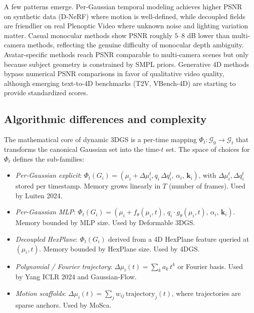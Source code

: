\documentclass{article}
\begin{document}
A few patterns emerge. Per-Gaussian temporal modeling achieves higher PSNR on synthetic data (D-NeRF) where motion is well-defined, while decoupled fields are friendlier on real Plenoptic Video where unknown noise and lighting variation matter. Casual monocular methods show PSNR roughly \(5\)--\(8\) dB lower than multi-camera methods, reflecting the genuine difficulty of monocular depth ambiguity. Avatar-specific methods reach PSNR comparable to multi-camera scenes but only because subject geometry is constrained by SMPL priors. Generative 4D methods bypass numerical PSNR comparisons in favor of qualitative video quality, although emerging text-to-4D benchmarks (T2V, VBench-4D) are starting to provide standardized scores.

\subsection{Algorithmic differences and complexity}\label{algorithmic-differences-and-complexity}

The mathematical core of dynamic 3DGS is a per-time mapping \(\Phi_t: \mathcal{G}_0 \to \mathcal{G}_t\) that transforms the canonical Gaussian set into the time-\(t\) set. The space of choices for \(\Phi_t\) defines the sub-families:

\begin{itemize}

\item
  \emph{Per-Gaussian explicit}: \(\Phi_t(G_i) = (\mu_i + \Delta\mu_i^t, q_i\,\Delta q_i^t,\,\alpha_i,\,\mathbf{k}_i)\), with \(\Delta\mu_i^t,\Delta q_i^t\) stored per timestamp. Memory grows linearly in \(T\) (number of frames). Used by Luiten 2024.
\item
  \emph{Per-Gaussian MLP}: \(\Phi_t(G_i) = (\mu_i + f_\theta(\mu_i,t),\, q_i\cdot g_\theta(\mu_i,t),\,\alpha_i,\,\mathbf{k}_i)\). Memory bounded by MLP size. Used by Deformable 3DGS.
\item
  \emph{Decoupled HexPlane}: \(\Phi_t(G_i)\) derived from a 4D HexPlane feature queried at \((\mu_i,t)\). Memory bounded by HexPlane size. Used by 4DGS.
\item
  \emph{Polynomial / Fourier trajectory}: \(\Delta\mu_i(t) = \sum_{k} a_k\,t^k\) or Fourier basis. Used by Yang ICLR 2024 and Gaussian-Flow.
\item
  \emph{Motion scaffolds}: \(\Delta\mu_i(t) = \sum_j w_{ij}\,\mathrm{trajectory}_j(t)\), where trajectories are sparse anchors. Used by MoSca.
\end{itemize}
\end{document}
